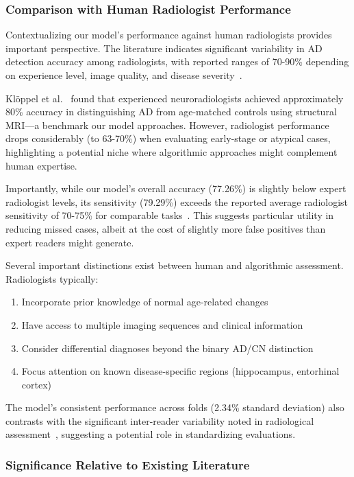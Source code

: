 \documentclass[12pt, a4paper]{article}
\begin{document}
\subsubsection{Comparison with Human Radiologist Performance}

Contextualizing our model's performance against human radiologists provides important perspective. The literature indicates significant variability in AD detection accuracy among radiologists, with reported ranges of 70-90\% depending on experience level, image quality, and disease severity~\cite{kloppel2008accuracy, frisoni2010clinical}.

Klöppel et al.~\cite{kloppel2008accuracy} found that experienced neuroradiologists achieved approximately 80\% accuracy in distinguishing AD from age-matched controls using structural MRI—a benchmark our model approaches. However, radiologist performance drops considerably (to 63-70\%) when evaluating early-stage or atypical cases, highlighting a potential niche where algorithmic approaches might complement human expertise.

Importantly, while our model's overall accuracy (77.26\%) is slightly below expert radiologist levels, its sensitivity (79.29\%) exceeds the reported average radiologist sensitivity of 70-75\% for comparable tasks~\cite{frisoni2010clinical}. This suggests particular utility in reducing missed cases, albeit at the cost of slightly more false positives than expert readers might generate.

Several important distinctions exist between human and algorithmic assessment. Radiologists typically:
\begin{enumerate}
    \item Incorporate prior knowledge of normal age-related changes
    \item Have access to multiple imaging sequences and clinical information
    \item Consider differential diagnoses beyond the binary AD/CN distinction
    \item Focus attention on known disease-specific regions (hippocampus, entorhinal cortex)
\end{enumerate}

The model's consistent performance across folds (2.34\% standard deviation) also contrasts with the significant inter-reader variability noted in radiological assessment~\cite{kloppel2008accuracy}, suggesting a potential role in standardizing evaluations.

\subsubsection{Significance Relative to Existing Literature}
\end{document}
